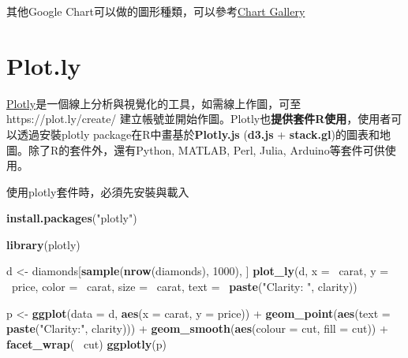 \documentclass[]{book}
\newenvironment{Shaded}{\begin{snugshade}}{\end{snugshade}}
\newcommand{\KeywordTok}[1]{\textcolor[rgb]{0.13,0.29,0.53}{\textbf{{#1}}}}
\newcommand{\DataTypeTok}[1]{\textcolor[rgb]{0.13,0.29,0.53}{{#1}}}
\newcommand{\DecValTok}[1]{\textcolor[rgb]{0.00,0.00,0.81}{{#1}}}
\newcommand{\StringTok}[1]{\textcolor[rgb]{0.31,0.60,0.02}{{#1}}}
\newcommand{\NormalTok}[1]{{#1}}
\theoremstyle{definition}
\theoremstyle{definition}
\theoremstyle{remark}
\begin{document}
其他Google
Chart可以做的圖形種類，可以參考\href{https://developers.google.com/chart/interactive/docs/gallery}{Chart
Gallery}

\section{Plot.ly}\label{plot.ly}

\href{https://plot.ly/}{Plotly}是一個線上分析與視覺化的工具，如需線上作圖，可至https://plot.ly/create/
建立帳號並開始作圖。Plotly也\textbf{提供套件R使用}，使用者可以透過安裝plotly\citep{R-plotly}
package在R中畫基於\textbf{Plotly.js} (\textbf{d3.js } +
\textbf{stack.gl})的圖表和地圖。除了R的套件外，還有Python, MATLAB, Perl,
Julia, Arduino等套件可供使用。

使用plotly套件時，必須先安裝與載入

\begin{Shaded}
\begin{Highlighting}[]
\KeywordTok{install.packages}\NormalTok{(}\StringTok{"plotly"}\NormalTok{)}
\end{Highlighting}
\end{Shaded}

\begin{Shaded}
\begin{Highlighting}[]
\KeywordTok{library}\NormalTok{(plotly)}
\end{Highlighting}
\end{Shaded}

\begin{Shaded}
\begin{Highlighting}[]
\NormalTok{d <-}\StringTok{ }\NormalTok{diamonds[}\KeywordTok{sample}\NormalTok{(}\KeywordTok{nrow}\NormalTok{(diamonds), }\DecValTok{1000}\NormalTok{), ]}
\KeywordTok{plot_ly}\NormalTok{(d, }\DataTypeTok{x =} \NormalTok{~carat, }\DataTypeTok{y =} \NormalTok{~price, }\DataTypeTok{color =} \NormalTok{~carat,}
        \DataTypeTok{size =} \NormalTok{~carat, }\DataTypeTok{text =} \NormalTok{~}\KeywordTok{paste}\NormalTok{(}\StringTok{"Clarity: "}\NormalTok{, clarity))}
\end{Highlighting}
\end{Shaded}

\hypertarget{htmlwidget-bb3f51547581b0f2326c}{}

\begin{Shaded}
\begin{Highlighting}[]
\NormalTok{p <-}\StringTok{ }\KeywordTok{ggplot}\NormalTok{(}\DataTypeTok{data =} \NormalTok{d, }\KeywordTok{aes}\NormalTok{(}\DataTypeTok{x =} \NormalTok{carat, }\DataTypeTok{y =} \NormalTok{price)) +}
\StringTok{  }\KeywordTok{geom_point}\NormalTok{(}\KeywordTok{aes}\NormalTok{(}\DataTypeTok{text =} \KeywordTok{paste}\NormalTok{(}\StringTok{"Clarity:"}\NormalTok{, clarity))) +}
\StringTok{  }\KeywordTok{geom_smooth}\NormalTok{(}\KeywordTok{aes}\NormalTok{(}\DataTypeTok{colour =} \NormalTok{cut, }\DataTypeTok{fill =} \NormalTok{cut)) +}\StringTok{ }\KeywordTok{facet_wrap}\NormalTok{(~}\StringTok{ }\NormalTok{cut)}
\KeywordTok{ggplotly}\NormalTok{(p)}
\end{Highlighting}
\end{Shaded}
\end{document}

